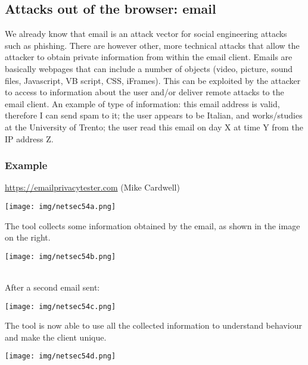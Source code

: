 \documentclass[a4paper, 10pt, titlepage]{article}
\begin{document}
\subsection{Attacks out of the browser: email}
We already know that email is an attack vector for social engineering attacks such as phishing. There are however other, more technical attacks that allow the attacker to obtain private information from within the email client. Emails are basically webpages that can include a number of objects (video, picture, sound files, Javascript, VB script, CSS, iFrames). This can be exploited by the attacker to access to information about the user and/or deliver remote attacks to the email client. An example of type of information: this email address is valid, therefore I can send spam to it; the user appears to be Italian, and works/studies at the University of Trento; the user read this email on day X at time Y from the IP address Z.

\subsubsection*{Example}
\url{https://emailprivacytester.com} (Mike Cardwell)\\
\begin{minipage}{0.45\textwidth}
	\begin{center}
		\texttt{[image: img/netsec54a.png]}
	\end{center}
The tool collects some information obtained by the email, as shown in the image on the right.
\end{minipage}\hfill
\begin{minipage}{0.45\textwidth}
	\begin{center}
		\texttt{[image: img/netsec54b.png]}
	\end{center}
\end{minipage} \medskip\\
After a second email sent:\\
\begin{minipage}{0.45\textwidth}
	\begin{center}
		\texttt{[image: img/netsec54c.png]}
	\end{center}
The tool is now able to use all the collected information to understand behaviour and make the client unique.
\end{minipage}\hfill
\begin{minipage}{0.45\textwidth}
	\begin{center}
		\texttt{[image: img/netsec54d.png]}
	\end{center}
\end{minipage}
\end{document}
